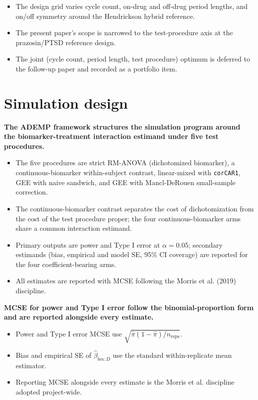 \documentclass[
  11pt,
]{article}
\begin{document}
\begin{itemize}\setlength{\itemsep}{2pt}\setlength{\parskip}{0pt}
\item The design grid varies cycle count, on-drug and off-drug period lengths, and on/off symmetry around the Hendrickson hybrid reference.
\item The present paper's scope is narrowed to the test-procedure axis at the prazosin/PTSD reference design.
\item The joint (cycle count, period length, test procedure) optimum is deferred to the follow-up paper and recorded as a portfolio item.
\end{itemize}

\section{Simulation design}\label{simulation-design}

\textbf{The ADEMP framework structures the simulation program around the biomarker-treatment interaction estimand under five test procedures.}

\begin{itemize}\setlength{\itemsep}{2pt}\setlength{\parskip}{0pt}
\item The five procedures are strict RM-ANOVA (dichotomized biomarker), a continuous-biomarker within-subject contrast, linear-mixed with \texttt{corCAR1}, GEE with naive sandwich, and GEE with Mancl-DeRouen small-sample correction.
\item The continuous-biomarker contrast separates the cost of dichotomization from the cost of the test procedure proper; the four continuous-biomarker arms share a common interaction estimand.
\item Primary outputs are power and Type I error at $\alpha = 0.05$; secondary estimands (bias, empirical and model SE, 95\% CI coverage) are reported for the four coefficient-bearing arms.
\item All estimates are reported with MCSE following the Morris et al. (2019) discipline.
\end{itemize}

\textbf{MCSE for power and Type I error follow the binomial-proportion form and are reported alongside every estimate.}

\begin{itemize}\setlength{\itemsep}{2pt}\setlength{\parskip}{0pt}
\item Power and Type I error MCSE use $\sqrt{\hat{\pi}(1-\hat{\pi})/n_{\text{reps}}}$.
\item Bias and empirical SE of $\hat{\beta}_{bm:D}$ use the standard within-replicate mean estimator.
\item Reporting MCSE alongside every estimate is the Morris et al. discipline adopted project-wide.
\end{itemize}
\end{document}
